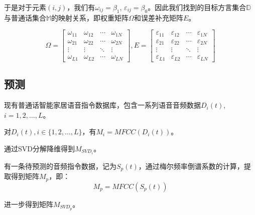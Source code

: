 \documentclass[lang=cn,cite=super]{elegantpaper}
\begin{document}
于是对于元素$(i,j)$，我们有$\omega_{ij} = \beta_1$, $\varepsilon_{ij} = \beta_0$。因此我们找到的目标方言集合$\mathbb{D}$与普通话集合$\mathbb{M}$的映射关系，即权重矩阵$\Omega$和误差补充矩阵$E$。

\begin{equation}
    \Omega = \begin{bmatrix}
        \omega_{11} & \omega_{12} & \cdots & \omega_{1N}\\
        \omega_{21} & \omega_{22} & \cdots & \omega_{2N}\\
        \vdots & \vdots & \ddots & \vdots \\
        \omega_{L1} & \omega_{L2} & \cdots & \omega_{LN}
    \end{bmatrix}, 
    E = \begin{bmatrix}
        \varepsilon_{11} & \varepsilon_{12} & \cdots & \varepsilon_{1N}\\
        \varepsilon_{21} & \varepsilon_{22} & \cdots & \varepsilon_{2N}\\
        \vdots & \vdots & \ddots & \vdots \\
        \varepsilon_{L1} & \varepsilon_{L2} & \cdots & \varepsilon_{LN}
    \end{bmatrix}
\end{equation}

\subsection{预测}
现有普通话智能家居语音指令数据库，包含一系列语音音频数据$D_i(t)$, $i = 1, 2, \ldots, L$。

对$D_i(t), i\in \{1,2,\ldots, L\}$，有$M_i = MFCC(D_i(t))$。

通过SVD分解降维得到$M_{SVD_i}$。

有一条待预测的音频指令数据，记为$S_p(t)$，通过梅尔频率倒谱系数的计算，提取得到矩阵$M_p$，即：
\begin{equation}
    M_p = MFCC(S_p(t))
\end{equation}

进一步得到矩阵$M_{SVD_p}$。
\end{document}

